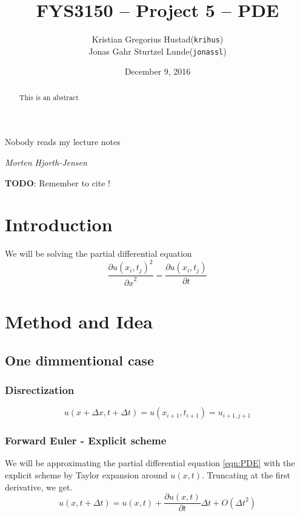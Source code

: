\documentclass[10pt,a4paper]{article}
\newcommand{\dt}{{\Delta t}}
\newcommand{\dx}{{\Delta x}}
\newcommand{\pt}{{\partial t}}
\newcommand{\px}{{\partial x}}
\newcommand{\pu}{{\partial u}}
\begin{document}
\title{FYS3150 -- Project 5 -- PDE}
\author{
	\begin{tabular}{rl}
        Kristian Gregorius Hustad & (\texttt{krihus})\\
        Jonas Gahr Sturtzel Lunde & (\texttt{jonassl})
	\end{tabular}}
\date{December 9, 2016}
\maketitle



\setlength{\epigraphwidth}{0.75\textwidth}
\renewcommand{\epigraphflush}{center}
\renewcommand{\beforeepigraphskip}{50pt}
\renewcommand{\afterepigraphskip}{100pt}
\renewcommand{\epigraphsize}{\normalsize}
\epigraph{Nobody reads my lecture notes}
	{\textit{Morten Hjorth-Jensen}}

\begin{abstract}
\noindent
This is an abstract
\end{abstract}

\pagebreak




\textbf{TODO}: Remember to cite \cite{hpl_fdm}!

\section{Introduction}
We will be solving the partial differential equation
\begin{equation}\label{eqn:PDE}
\frac{\pu(x_i,t_j)^2}{\px^2} = \frac{\pu(x_i,t_j)}{\pt}
\end{equation}

\section{Method and Idea}
\subsection{One dimmentional case}
\subsubsection{Disrectization}
\begin{equation}
u(x+\dx, t+\dt) = u(x_{i+1},t_{i+1}) = u_{i+1,j+1}
\end{equation}

\subsubsection{Forward Euler - Explicit scheme}
We will be approximating the partial differential equation \ref{eqn:PDE} with the explicit scheme by Taylor expansion around $u(x,t)$. Truncating at the first derivative, we get.
\begin{equation}
u(x,t+\dt) = u(x,t) + \frac{\pu(x,t)}{\pt}\dt + O(\dt^2)
\end{equation}
\end{document}
